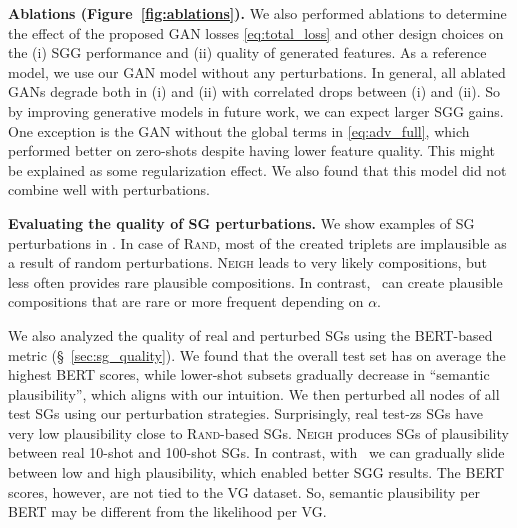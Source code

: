 \textbf{Ablations (Figure~\ref{fig:ablations}).} We also performed ablations to determine the effect of the proposed GAN losses \eqref{eq:total_loss} and other design choices on the (i) SGG performance and (ii) quality of generated features. As a reference model, we use our GAN model without any perturbations. 
In general, all ablated GANs degrade both in (i) and (ii) with correlated drops between (i) and (ii). So by improving generative models in future work, we can expect larger SGG gains. One exception is the GAN without the global terms in \eqref{eq:adv_full}, which performed better on zero-shots despite having lower feature quality. This might be explained as some regularization effect. We also found that this model did not combine well with perturbations.


\textbf{Evaluating the quality of SG perturbations.}
We show examples of SG perturbations in \fig{\ref{fig:examples}}. In case of \textsc{Rand}, most of the created triplets are implausible as a result of random perturbations. \textsc{Neigh} leads to very likely compositions, but less often provides rare plausible compositions.
In contrast, \structn~can create plausible compositions that are rare or more frequent depending on $\alpha$.

We also analyzed the quality of real and perturbed SGs using the BERT-based metric (\S~\ref{sec:sg_quality}).
We found that the overall test set has on average the highest BERT scores, while lower-shot subsets gradually decrease in ``semantic plausibility'', which aligns with our intuition. We then perturbed all nodes of all test SGs using our perturbation strategies. Surprisingly, real test-zs SGs have very low plausibility close to \textsc{Rand}-based SGs. \textsc{Neigh} produces SGs of plausibility between real 10-shot and 100-shot SGs. In contrast, with \structn~we can gradually slide between low and high plausibility, which enabled better SGG results. The BERT scores, however, are not tied to the VG dataset. So, semantic plausibility per BERT may be different from the likelihood per VG.


